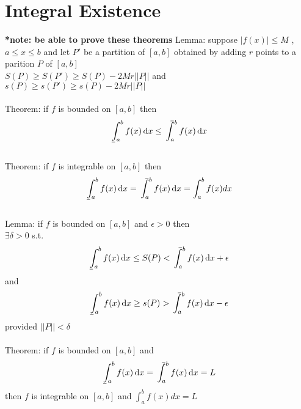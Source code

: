 \documentclass[12pt]{article}
\def\upint{\mathchoice%
    {\mkern13mu\overline{\vphantom{\intop}\mkern7mu}\mkern-20mu}%
    {\mkern7mu\overline{\vphantom{\intop}\mkern7mu}\mkern-14mu}%
    {\mkern7mu\overline{\vphantom{\intop}\mkern7mu}\mkern-14mu}%
    {\mkern7mu\overline{\vphantom{\intop}\mkern7mu}\mkern-14mu}%
  \int}
\def\lowint{\mkern3mu\underline{\vphantom{\intop}\mkern7mu}\mkern-10mu\int}
\begin{document}
\section{Integral Existence}
\textbf{*note: be able to prove these theorems}
Lemma: suppose $|f(x)| \le M$ , $a \le x \le b$ and let $P'$ be a partition of $[a,b]$ obtained by adding $r$ points to a parition $P$ of $[a,b]$ \\
$S(P) \ge S(P') \ge S(P) - 2Mr||P||$ and \\
$s(P) \ge s(P') \ge s(P) - 2Mr||P||$ \\
\\
Theorem: if $f$ is bounded on $[a,b]$ then 
\begin{gather*}
   \lowint_a^b f(x)\,\mathrm{d}x \le \upint_a^b f(x)\,\mathrm{d}x \\
\end{gather*}
\\
Theorem: if $f$ is integrable on $[a,b]$ then
\begin{gather*}
	\lowint_a^b f(x)\,\mathrm{d}x = \upint_a^b f(x)\,\mathrm{d}x = \int_{a}^{b}f(x)dx \\
\end{gather*}
\\
Lemma: if $f$ is bounded on $[a,b]$ and $\epsilon > 0$ then \\
$\exists \delta > 0$ s.t.
\begin{gather*}
	\lowint_a^b f(x)\,\mathrm{d}x \le S(P) < \upint_a^b f(x)\,\mathrm{d}x + \epsilon \\
\end{gather*}
and
\begin{gather*}
	\lowint_a^b f(x)\,\mathrm{d}x \ge s(P) > \upint_a^b f(x)\,\mathrm{d}x - \epsilon \\
\end{gather*}
provided $||P|| < \delta$ \\
\\
Theorem: if $f$ is bounded on $[a,b]$ and
\begin{gather*}
   \lowint_a^b f(x)\,\mathrm{d}x = \upint_a^b f(x)\,\mathrm{d}x = L \\
\end{gather*} 
then $f$ is integrable on $[a, b]$ and $\int_{a}^{b}f(x)dx = L$
\end{document}
